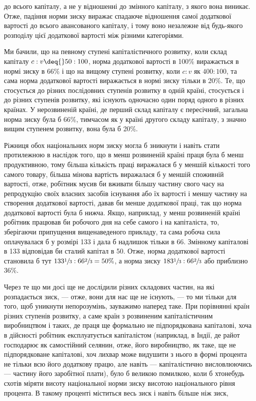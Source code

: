 \parcont{}  %
до всього капіталу, а не у відношенні до змінного капіталу, з
якого вона виникає. Отже, падіння норми зиску виражає спадаюче
відношення самої додаткової вартості до всього авансованого
капіталу, і тому воно незалежне від будь-якого розподілу
цієї додаткової вартості між різними категоріями.

Ми бачили, що на певному ступені капіталістичного розвитку,
коли склад капіталу $c : v \deq{} 50 : 100$, норма додаткової вартості
в 100\% виражається в нормі зиску в 66\% і що на вищому
ступені розвитку, коли $c : v$ як $400 : 100$, та сама норма додаткової
вартості виражається в нормі зиску тільки в 20\%. Те, що
стосується до різних послідовних ступенів розвитку в одній
країні, стосується і до різних ступенів розвитку, які існують
одночасно один поряд одного в різних країнах. У нерозвиненій
країні, де перший склад капіталу є пересічний, загальна норма
зиску була б \deq{} 66\%, тимчасом як у країні другого складу капіталу,
з значно вищим ступенем розвитку, вона була б \deq{} 20\%.

Ріжниця обох національних норм зиску могла б зникнути і
навіть стати протилежною в наслідок того, що в менш розвиненій
країні праця була б менш продуктивною, тому більша
кількість праці виражалася б у меншій кількості того самого
товару, більша мінова вартість виражалася б у меншій споживній
вартості, отже, робітник мусив би вживати більшу частину
свого часу на репродукцію своїх власних засобів існування або
їх вартості і меншу частину на створення додаткової вартості,
давав би менше додаткової праці, так що норма додаткової
вартості була б нижча. Якщо, наприклад, у менш розвиненій країні
робітник працював би  робочого дня на себе самого і  на
капіталіста, то, зберігаючи припущення вищенаведеного прикладу,
та сама робоча сила оплачувалася б у розмірі 133 і дала б
надлишок тільки в 66. Змінному капіталові в 133 відповідав
би сталий капітал в 50. Отже, норма додаткової вартості становила
б тут $133\sfrac{1}{3} : 66\sfrac{2}{3}= 50\%$, а норма зиску $183\sfrac{1}{3}:
66\sfrac{2}{3}$ або приблизно 36\%.

Через те що ми досі ще не дослідили різних складових частин,
на які розпадається зиск, — отже, вони для нас ще не існують,
— то ми тільки для того, щоб уникнути непорозумінь,
зауважимо наперед таке. При порівнянні країн різних ступенів
розвитку, а саме країн з розвиненим капіталістичним виробництвом
і таких, де праця ще формально не підпорядкована капіталові,
хоча в дійсності робітник експлуатується капіталістом
(наприклад, в Індії, де райот господарює як самостійний селянин,
отже, його виробництво, як таке, ще не підпорядковане капіталові,
хоч лихвар може видушити з нього в формі процента
не тільки всю його додаткову працю, але навіть — капіталістично
висловлюючись — частину його заробітної плати), було б
великою помилкою, коли б хтонебудь схотів міряти висоту національної
норми зиску висотою національного рівня процента.
В такому проценті міститься весь зиск і навіть більше ніж зиск,
\parbreak{}  %

